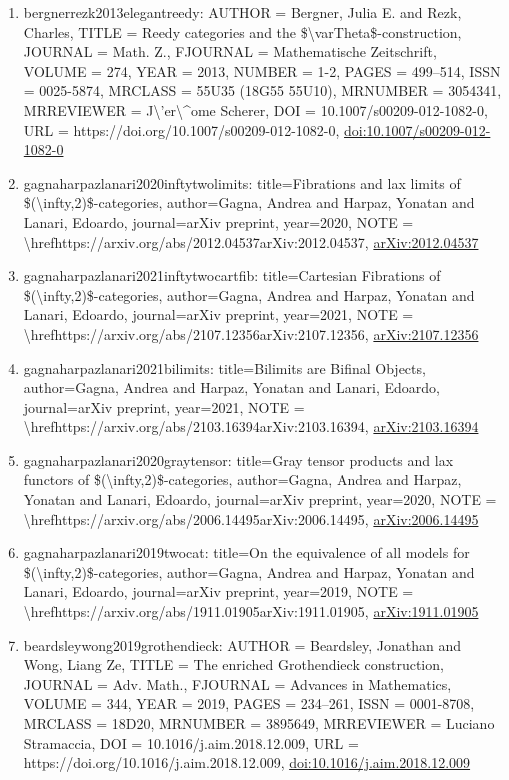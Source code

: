 \documentclass[11pt]{article}
\begin{document}
\begin{enumerate}[leftmargin=*]
  \item bergnerrezk2013elegantreedy: AUTHOR = Bergner, Julia E. and Rezk, Charles, TITLE = Reedy categories and the \$\textbackslash{}varTheta\$-construction, JOURNAL = Math. Z., FJOURNAL = Mathematische Zeitschrift, VOLUME = 274, YEAR = 2013, NUMBER = 1-2, PAGES = 499--514, ISSN = 0025-5874, MRCLASS = 55U35 (18G55 55U10), MRNUMBER = 3054341, MRREVIEWER = J\textbackslash{}'er\textbackslash{}\^{}ome Scherer, DOI = 10.1007/s00209-012-1082-0, URL = https://doi.org/10.1007/s00209-012-1082-0, \href{https://doi.org/10.1007/s00209-012-1082-0}{doi:10.1007/s00209-012-1082-0}
  \item gagnaharpazlanari2020inftytwolimits: title=Fibrations and lax limits of \$(\textbackslash{}infty,2)\$-categories, author=Gagna, Andrea and Harpaz, Yonatan and Lanari, Edoardo, journal=arXiv preprint, year=2020, NOTE = \textbackslash{}hrefhttps://arxiv.org/abs/2012.04537arXiv:2012.04537, \href{https://arxiv.org/abs/2012.04537}{arXiv:2012.04537}
  \item gagnaharpazlanari2021inftytwocartfib: title=Cartesian Fibrations of \$(\textbackslash{}infty,2)\$-categories, author=Gagna, Andrea and Harpaz, Yonatan and Lanari, Edoardo, journal=arXiv preprint, year=2021, NOTE = \textbackslash{}hrefhttps://arxiv.org/abs/2107.12356arXiv:2107.12356, \href{https://arxiv.org/abs/2107.12356}{arXiv:2107.12356}
  \item gagnaharpazlanari2021bilimits: title=Bilimits are Bifinal Objects, author=Gagna, Andrea and Harpaz, Yonatan and Lanari, Edoardo, journal=arXiv preprint, year=2021, NOTE = \textbackslash{}hrefhttps://arxiv.org/abs/2103.16394arXiv:2103.16394, \href{https://arxiv.org/abs/2103.16394}{arXiv:2103.16394}
  \item gagnaharpazlanari2020graytensor: title=Gray tensor products and lax functors of \$(\textbackslash{}infty,2)\$-categories, author=Gagna, Andrea and Harpaz, Yonatan and Lanari, Edoardo, journal=arXiv preprint, year=2020, NOTE = \textbackslash{}hrefhttps://arxiv.org/abs/2006.14495arXiv:2006.14495, \href{https://arxiv.org/abs/2006.14495}{arXiv:2006.14495}
  \item gagnaharpazlanari2019twocat: title=On the equivalence of all models for \$(\textbackslash{}infty,2)\$-categories, author=Gagna, Andrea and Harpaz, Yonatan and Lanari, Edoardo, journal=arXiv preprint, year=2019, NOTE = \textbackslash{}hrefhttps://arxiv.org/abs/1911.01905arXiv:1911.01905, \href{https://arxiv.org/abs/1911.01905}{arXiv:1911.01905}
  \item beardsleywong2019grothendieck: AUTHOR = Beardsley, Jonathan and Wong, Liang Ze, TITLE = The enriched Grothendieck construction, JOURNAL = Adv. Math., FJOURNAL = Advances in Mathematics, VOLUME = 344, YEAR = 2019, PAGES = 234--261, ISSN = 0001-8708, MRCLASS = 18D20, MRNUMBER = 3895649, MRREVIEWER = Luciano Stramaccia, DOI = 10.1016/j.aim.2018.12.009, URL = https://doi.org/10.1016/j.aim.2018.12.009, \href{https://doi.org/10.1016/j.aim.2018.12.009}{doi:10.1016/j.aim.2018.12.009}

\end{enumerate}
\end{document}
